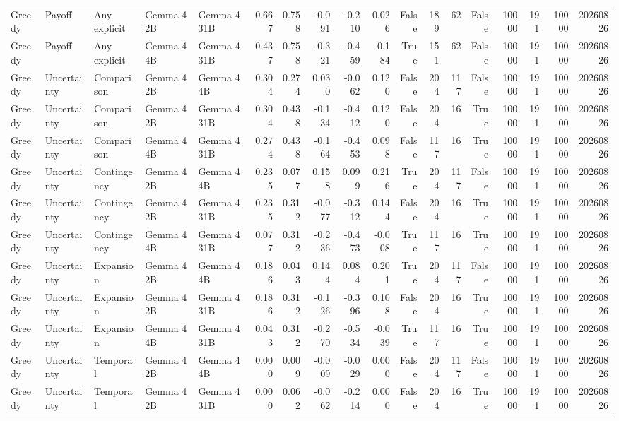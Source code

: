 \begin{tabular}{lllllrrrrrrrrrrrrr}
Greedy & Payoff & Any explicit & Gemma 4 2B & Gemma 4 31B & 0.667 & 0.758 & -0.091 & -0.210 & 0.026 & False & 189 & 62 & False & 10000 & 191 & 10000 & 20260826 \\
Greedy & Payoff & Any explicit & Gemma 4 4B & Gemma 4 31B & 0.437 & 0.758 & -0.321 & -0.459 & -0.184 & True & 151 & 62 & False & 10000 & 191 & 10000 & 20260826 \\
Greedy & Uncertainty & Comparison & Gemma 4 2B & Gemma 4 4B & 0.304 & 0.274 & 0.030 & -0.062 & 0.120 & False & 204 & 117 & False & 10000 & 191 & 10000 & 20260826 \\
Greedy & Uncertainty & Comparison & Gemma 4 2B & Gemma 4 31B & 0.304 & 0.438 & -0.134 & -0.412 & 0.120 & False & 204 & 16 & True & 10000 & 191 & 10000 & 20260826 \\
Greedy & Uncertainty & Comparison & Gemma 4 4B & Gemma 4 31B & 0.274 & 0.438 & -0.164 & -0.453 & 0.098 & False & 117 & 16 & True & 10000 & 191 & 10000 & 20260826 \\
Greedy & Uncertainty & Contingency & Gemma 4 2B & Gemma 4 4B & 0.235 & 0.077 & 0.158 & 0.099 & 0.216 & True & 204 & 117 & False & 10000 & 191 & 10000 & 20260826 \\
Greedy & Uncertainty & Contingency & Gemma 4 2B & Gemma 4 31B & 0.235 & 0.312 & -0.077 & -0.312 & 0.144 & False & 204 & 16 & True & 10000 & 191 & 10000 & 20260826 \\
Greedy & Uncertainty & Contingency & Gemma 4 4B & Gemma 4 31B & 0.077 & 0.312 & -0.236 & -0.473 & -0.008 & True & 117 & 16 & True & 10000 & 191 & 10000 & 20260826 \\
Greedy & Uncertainty & Expansion & Gemma 4 2B & Gemma 4 4B & 0.186 & 0.043 & 0.144 & 0.084 & 0.201 & True & 204 & 117 & False & 10000 & 191 & 10000 & 20260826 \\
Greedy & Uncertainty & Expansion & Gemma 4 2B & Gemma 4 31B & 0.186 & 0.312 & -0.126 & -0.396 & 0.108 & False & 204 & 16 & True & 10000 & 191 & 10000 & 20260826 \\
Greedy & Uncertainty & Expansion & Gemma 4 4B & Gemma 4 31B & 0.043 & 0.312 & -0.270 & -0.534 & -0.039 & True & 117 & 16 & True & 10000 & 191 & 10000 & 20260826 \\
Greedy & Uncertainty & Temporal & Gemma 4 2B & Gemma 4 4B & 0.000 & 0.009 & -0.009 & -0.029 & 0.000 & False & 204 & 117 & False & 10000 & 191 & 10000 & 20260826 \\
Greedy & Uncertainty & Temporal & Gemma 4 2B & Gemma 4 31B & 0.000 & 0.062 & -0.062 & -0.214 & 0.000 & False & 204 & 16 & True & 10000 & 191 & 10000 & 20260826 \\

\end{tabular}
